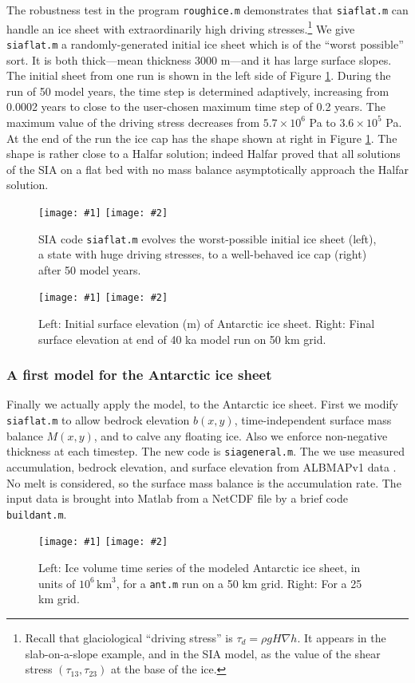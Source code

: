 \documentclass[titlepage,letterpaper,final,12pt]{scrartcl}
\newcommand{\grad}{\nabla}
\newcommand{\twofigsizes}[5]{
\begin{figure}[ht]
\centering
\texttt{[image: \#1]} \quad
\texttt{[image: \#2]}
\caption{#3}
\label{fig:#1}
\end{figure}}
\newcommand{\twofig}[3]{\twofigsizes{#1}{#2}{#3}{2.5in}{2.5in}}
\begin{document}
The robustness test in the program \texttt{roughice.m} demonstrates that \texttt{siaflat.m} can handle an ice sheet with extraordinarily high driving stresses.\footnote{Recall that glaciological ``driving stress'' is $\tau_d = \rho g H \grad h$.  It appears in the slab-on-a-slope example, and in the SIA model, as the value of the shear stress $(\tau_{13},\tau_{23})$ at the base of the ice.}  We give \texttt{siaflat.m} a randomly-generated initial ice sheet which is of the ``worst possible'' sort.  It is both thick---mean thickness 3000 m---and it has large surface slopes.  The initial sheet from one run is shown in the left side of Figure \ref{fig:roughinitial}.  During the run of 50 model years, the time step is determined adaptively, increasing from 0.0002 years to close to the user-chosen maximum time step of 0.2 years.  The maximum value of the driving stress decreases from $5.7\times 10^6$ Pa to $3.6\times 10^5$ Pa.  At the end of the run the ice cap has the shape shown at right in Figure \ref{fig:roughinitial}.  The shape is rather close to a Halfar solution; indeed Halfar proved that all solutions of the SIA on a flat bed with no mass balance asymptotically approach the Halfar solution.

\twofig{roughinitial}{roughfinal}{SIA code \texttt{siaflat.m} evolves the worst-possible initial ice sheet (left), a state with huge driving stresses, to a well-behaved ice cap (right) after 50 model years.}

\twofigsizes{antinitial}{antfinal}{Left: Initial surface elevation (m) of Antarctic ice sheet.  Right: Final surface elevation at end of 40 ka model run on 50 km grid.}{2.55in}{3.2in}

\subsubsection*{A first model for the Antarctic ice sheet}  Finally we actually apply the model, to the Antarctic ice sheet.  First we modify \texttt{siaflat.m} to allow bedrock elevation $b(x,y)$, time-independent surface mass balance $M(x,y)$, and to calve any floating ice.  Also we enforce non-negative thickness at each timestep.  The new code is \texttt{siageneral.m}.  The we use measured accumulation, bedrock elevation, and surface elevation from ALBMAPv1 data \cite{LeBrocqetal2010}.  No melt is considered, so the surface mass balance is the accumulation rate.  The input data is brought into Matlab from a NetCDF file by a brief code \texttt{buildant.m}.

\twofig{antvol}{antvol25km}{Left: Ice volume time series of the modeled Antarctic ice sheet, in units of $10^6 \, \text{km}^3$, for a \texttt{ant.m} run on a 50 km grid.  Right:  For a 25 km grid.}
\end{document}
